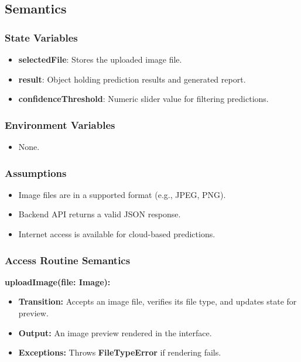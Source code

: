 \documentclass[12pt, titlepage]{article}
\begin{document}
\subsection{Semantics}

\subsubsection{State Variables}
\begin{itemize}
    \item \textbf{selectedFile}: Stores the uploaded image file.
    \item \textbf{result}: Object holding prediction results and generated report.
    \item \textbf{confidenceThreshold}: Numeric slider value for filtering predictions.
\end{itemize}

\subsubsection{Environment Variables}
\begin{itemize}
    \item None.
\end{itemize}

\subsubsection{Assumptions}
\begin{itemize}
    \item Image files are in a supported format (e.g., JPEG, PNG).
    \item Backend API returns a valid JSON response.
    \item Internet access is available for cloud-based predictions.
\end{itemize}

\subsubsection{Access Routine Semantics}

\textbf{uploadImage(file: Image):}
\begin{itemize}
    \item \textbf{Transition:} Accepts an image file, verifies its file type, and updates state for preview.
    \item \textbf{Output:} An image preview rendered in the interface.
    \item \textbf{Exceptions:} Throws \textbf{FileTypeError} if rendering fails.
\end{itemize}
\end{document}
